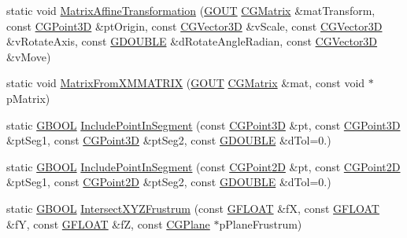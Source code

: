 \begin{DoxyCompactItemize}
\item 
static void \hyperlink{class_c_g_math_a0cc1bbb81343dff7a7d7b8ba7c257b53}{Matrix\+Affine\+Transformation} (\hyperlink{_g_types_8h_a0858ec221262e635612871d70ca233ad}{G\+O\+U\+T} \hyperlink{class_c_g_matrix}{C\+G\+Matrix} \&mat\+Transform, const \hyperlink{class_c_g_point3_d}{C\+G\+Point3\+D} \&pt\+Origin, const \hyperlink{_g_point3_d_8h_aa7e73d39f4c991acb5a13c84b498366d}{C\+G\+Vector3\+D} \&v\+Scale, const \hyperlink{_g_point3_d_8h_aa7e73d39f4c991acb5a13c84b498366d}{C\+G\+Vector3\+D} \&v\+Rotate\+Axis, const \hyperlink{_g_types_8h_afd05ac85f90ee8e2a733928545462cd4}{G\+D\+O\+U\+B\+L\+E} \&d\+Rotate\+Angle\+Radian, const \hyperlink{_g_point3_d_8h_aa7e73d39f4c991acb5a13c84b498366d}{C\+G\+Vector3\+D} \&v\+Move)
\item 
static void \hyperlink{class_c_g_math_ab938a5dc9d79f1a83cc9b1a03fde5d16}{Matrix\+From\+X\+M\+M\+A\+T\+R\+I\+X} (\hyperlink{_g_types_8h_a0858ec221262e635612871d70ca233ad}{G\+O\+U\+T} \hyperlink{class_c_g_matrix}{C\+G\+Matrix} \&mat, const void $\ast$p\+Matrix)
\item 
static \hyperlink{_g_types_8h_a2901915743626352a6820c5405f556dc}{G\+B\+O\+O\+L} \hyperlink{class_c_g_math_a9e2b9a072592109d7c46508014085cb0}{Include\+Point\+In\+Segment} (const \hyperlink{class_c_g_point3_d}{C\+G\+Point3\+D} \&pt, const \hyperlink{class_c_g_point3_d}{C\+G\+Point3\+D} \&pt\+Seg1, const \hyperlink{class_c_g_point3_d}{C\+G\+Point3\+D} \&pt\+Seg2, const \hyperlink{_g_types_8h_afd05ac85f90ee8e2a733928545462cd4}{G\+D\+O\+U\+B\+L\+E} \&d\+Tol=0.)
\item 
static \hyperlink{_g_types_8h_a2901915743626352a6820c5405f556dc}{G\+B\+O\+O\+L} \hyperlink{class_c_g_math_a7fd0d95eb2baf6b5c45abd2aa9e1cae8}{Include\+Point\+In\+Segment} (const \hyperlink{class_c_g_point2_d}{C\+G\+Point2\+D} \&pt, const \hyperlink{class_c_g_point2_d}{C\+G\+Point2\+D} \&pt\+Seg1, const \hyperlink{class_c_g_point2_d}{C\+G\+Point2\+D} \&pt\+Seg2, const \hyperlink{_g_types_8h_afd05ac85f90ee8e2a733928545462cd4}{G\+D\+O\+U\+B\+L\+E} \&d\+Tol=0.)
\item 
static \hyperlink{_g_types_8h_a2901915743626352a6820c5405f556dc}{G\+B\+O\+O\+L} \hyperlink{class_c_g_math_a679f412376490d469dc05bd41daa892d}{Intersect\+X\+Y\+Z\+Frustrum} (const \hyperlink{_g_types_8h_abf6eba8223df62f199b811a6c52ff2ef}{G\+F\+L\+O\+A\+T} \&f\+X, const \hyperlink{_g_types_8h_abf6eba8223df62f199b811a6c52ff2ef}{G\+F\+L\+O\+A\+T} \&f\+Y, const \hyperlink{_g_types_8h_abf6eba8223df62f199b811a6c52ff2ef}{G\+F\+L\+O\+A\+T} \&f\+Z, const \hyperlink{class_c_g_plane}{C\+G\+Plane} $\ast$p\+Plane\+Frustrum)

\end{DoxyCompactItemize}
